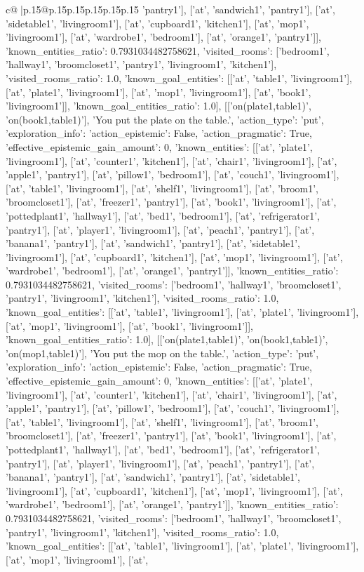 \documentclass{article}
\begin{document}
{\begin{supertabular}{c@{$\;$}|p{.15\linewidth}@{}p{.15\linewidth}p{.15\linewidth}p{.15\linewidth}p{.15\linewidth}p{.15\linewidth}}
{{{'pantry1'], ['at', 'sandwich1', 'pantry1'], ['at', 'sidetable1', 'livingroom1'], ['at', 'cupboard1', 'kitchen1'], ['at', 'mop1', 'livingroom1'], ['at', 'wardrobe1', 'bedroom1'], ['at', 'orange1', 'pantry1']], 'known_entities_ratio': 0.7931034482758621, 'visited_rooms': ['bedroom1', 'hallway1', 'broomcloset1', 'pantry1', 'livingroom1', 'kitchen1'], 'visited_rooms_ratio': 1.0, 'known_goal_entities': [['at', 'table1', 'livingroom1'], ['at', 'plate1', 'livingroom1'], ['at', 'mop1', 'livingroom1'], ['at', 'book1', 'livingroom1']], 'known_goal_entities_ratio': 1.0}}], [['on(plate1,table1)', 'on(book1,table1)'], 'You put the plate on the table.\n', {'action_type': 'put', 'exploration_info': {'action_epistemic': False, 'action_pragmatic': True, 'effective_epistemic_gain_amount': 0, 'known_entities': [['at', 'plate1', 'livingroom1'], ['at', 'counter1', 'kitchen1'], ['at', 'chair1', 'livingroom1'], ['at', 'apple1', 'pantry1'], ['at', 'pillow1', 'bedroom1'], ['at', 'couch1', 'livingroom1'], ['at', 'table1', 'livingroom1'], ['at', 'shelf1', 'livingroom1'], ['at', 'broom1', 'broomcloset1'], ['at', 'freezer1', 'pantry1'], ['at', 'book1', 'livingroom1'], ['at', 'pottedplant1', 'hallway1'], ['at', 'bed1', 'bedroom1'], ['at', 'refrigerator1', 'pantry1'], ['at', 'player1', 'livingroom1'], ['at', 'peach1', 'pantry1'], ['at', 'banana1', 'pantry1'], ['at', 'sandwich1', 'pantry1'], ['at', 'sidetable1', 'livingroom1'], ['at', 'cupboard1', 'kitchen1'], ['at', 'mop1', 'livingroom1'], ['at', 'wardrobe1', 'bedroom1'], ['at', 'orange1', 'pantry1']], 'known_entities_ratio': 0.7931034482758621, 'visited_rooms': ['bedroom1', 'hallway1', 'broomcloset1', 'pantry1', 'livingroom1', 'kitchen1'], 'visited_rooms_ratio': 1.0, 'known_goal_entities': [['at', 'table1', 'livingroom1'], ['at', 'plate1', 'livingroom1'], ['at', 'mop1', 'livingroom1'], ['at', 'book1', 'livingroom1']], 'known_goal_entities_ratio': 1.0}}], [['on(plate1,table1)', 'on(book1,table1)', 'on(mop1,table1)'], 'You put the mop on the table.\n', {'action_type': 'put', 'exploration_info': {'action_epistemic': False, 'action_pragmatic': True, 'effective_epistemic_gain_amount': 0, 'known_entities': [['at', 'plate1', 'livingroom1'], ['at', 'counter1', 'kitchen1'], ['at', 'chair1', 'livingroom1'], ['at', 'apple1', 'pantry1'], ['at', 'pillow1', 'bedroom1'], ['at', 'couch1', 'livingroom1'], ['at', 'table1', 'livingroom1'], ['at', 'shelf1', 'livingroom1'], ['at', 'broom1', 'broomcloset1'], ['at', 'freezer1', 'pantry1'], ['at', 'book1', 'livingroom1'], ['at', 'pottedplant1', 'hallway1'], ['at', 'bed1', 'bedroom1'], ['at', 'refrigerator1', 'pantry1'], ['at', 'player1', 'livingroom1'], ['at', 'peach1', 'pantry1'], ['at', 'banana1', 'pantry1'], ['at', 'sandwich1', 'pantry1'], ['at', 'sidetable1', 'livingroom1'], ['at', 'cupboard1', 'kitchen1'], ['at', 'mop1', 'livingroom1'], ['at', 'wardrobe1', 'bedroom1'], ['at', 'orange1', 'pantry1']], 'known_entities_ratio': 0.7931034482758621, 'visited_rooms': ['bedroom1', 'hallway1', 'broomcloset1', 'pantry1', 'livingroom1', 'kitchen1'], 'visited_rooms_ratio': 1.0, 'known_goal_entities': [['at', 'table1', 'livingroom1'], ['at', 'plate1', 'livingroom1'], ['at', 'mop1', 'livingroom1'], ['at', }}}
\end{supertabular}}
\end{document}
